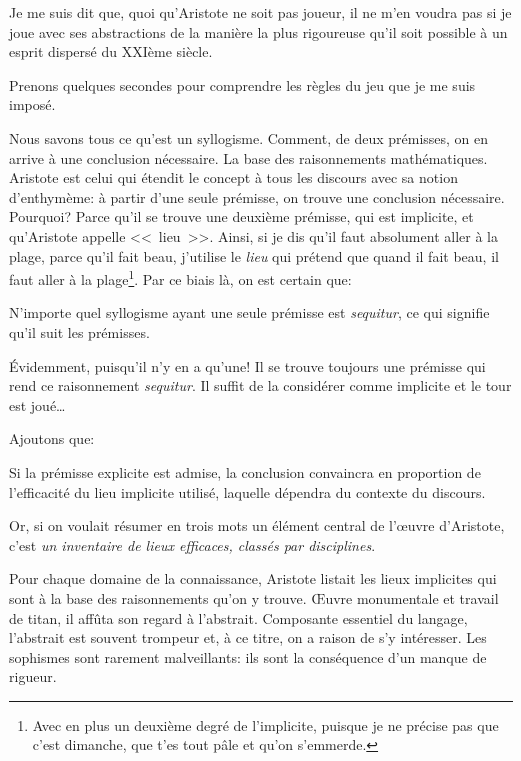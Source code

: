 Je me suis dit que, quoi qu'Aristote ne soit pas joueur, il ne m'en voudra pas si je joue avec ses abstractions de la
manière la plus rigoureuse qu'il soit possible à un esprit dispersé du XXIème siècle.

Prenons quelques secondes pour comprendre les règles du jeu que je me suis imposé.

Nous savons tous ce qu'est un syllogisme. Comment, de deux prémisses, on en arrive à une conclusion nécessaire.
La base des raisonnements mathématiques. Aristote est celui qui étendit le concept à tous les discours avec sa
notion d'enthymème: à partir d'une seule prémisse, on trouve une conclusion nécessaire. Pourquoi? Parce qu'il
se trouve une deuxième prémisse, qui est implicite, et qu'Aristote appelle <<~lieu~>>. Ainsi, si je dis qu'il faut
absolument aller à la plage, parce qu'il fait beau, j'utilise le \emph{lieu} qui prétend que quand il fait beau,
il faut aller à la plage\footnote{Avec en plus un deuxième degré de l'implicite, puisque je ne précise pas que c'est
dimanche, que t'es tout pâle et qu'on s'emmerde.}. Par ce biais là, on est certain que:

\begin{emphpar}
	N'importe quel syllogisme ayant une seule prémisse est \emph{sequitur}, ce qui signifie qu'il suit les
	prémisses.
\end{emphpar}

Évidemment, puisqu'il n'y en a qu'une! Il se trouve toujours une prémisse qui rend ce raisonnement \emph{sequitur}.
Il suffit de la considérer comme implicite et le tour est joué\dots{}

Ajoutons que:

\begin{emphpar}
	Si la prémisse explicite est admise, la conclusion convaincra en proportion de l'efficacité du lieu implicite utilisé,
	laquelle dépendra du contexte du discours.
\end{emphpar}

Or, si on voulait résumer en trois mots un élément central de l’œuvre d'Aristote, c'est \emph{un inventaire de lieux
efficaces, classés par disciplines}.

Pour chaque domaine de la connaissance, Aristote listait les lieux implicites qui sont à la base des raisonnements
qu'on y trouve. Œuvre monumentale et travail de titan, il affûta son regard à l'abstrait. Composante essentiel du
langage, l'abstrait est souvent trompeur et, à ce titre, on a raison de s'y intéresser. Les sophismes sont rarement
malveillants: ils sont la conséquence d'un manque de rigueur.

